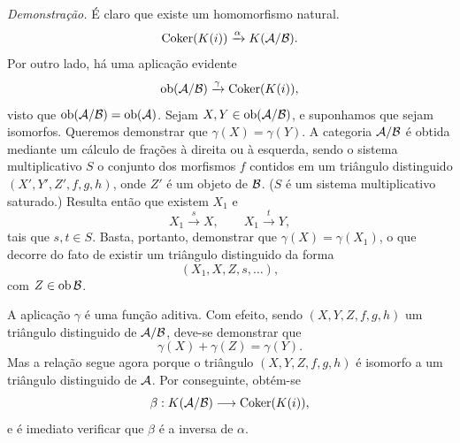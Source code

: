 \emph{Demonstração.} É claro que existe um homomorfismo natural.
\[
\operatorname{Coker}(K(i))\xrightarrow{\alpha}K(\mathcal A/\mathcal B).
\]
Por outro lado, há uma aplicação evidente
\[
\operatorname{ob}(\mathcal A/\mathcal B)\xrightarrow{\gamma}\operatorname{Coker}(K(i)),
\]
visto que $\operatorname{ob}(\mathcal A/\mathcal B)=\operatorname{ob}(\mathcal A)$. Sejam $X,Y\in\operatorname{ob}(\mathcal A/\mathcal B)$, e suponhamos que sejam isomorfos. Queremos demonstrar que $\gamma(X)=\gamma(Y)$. A categoria $\mathcal A/\mathcal B$ é obtida mediante um cálculo de frações à direita ou à esquerda, sendo o sistema multiplicativo $S$ o conjunto dos morfismos $f$ contidos em um triângulo distinguido $(X',Y',Z',f,g,h)$, onde $Z'$ é um objeto de $\mathcal B$. ($S$ é um sistema multiplicativo saturado.) Resulta então que existem $X_1$ e
\[
X_1\xrightarrow{s}X,\qquad X_1\xrightarrow{t}Y,
\]
tais que $s,t\in S$. Basta, portanto, demonstrar que $\gamma(X)=\gamma(X_1)$, o que decorre do fato de existir um triângulo distinguido da forma
\[
(X_1,X,Z,s,\ldots),
\]
com $Z\in\operatorname{ob}\mathcal B$.

A aplicação $\gamma$ é uma função aditiva. Com efeito, sendo $(X,Y,Z,f,g,h)$ um triângulo distinguido de $\mathcal A/\mathcal B$, deve-se demonstrar que
\[
\gamma(X)+\gamma(Z)=\gamma(Y).
\]
Mas a relação segue agora porque o triângulo $(X,Y,Z,f,g,h)$ é isomorfo a um triângulo distinguido de $\mathcal A$. Por conseguinte, obtém-se
\[
\beta:K(\mathcal A/\mathcal B)\longrightarrow \operatorname{Coker}(K(i)),
\]
e é imediato verificar que $\beta$ é a inversa de $\alpha$.

